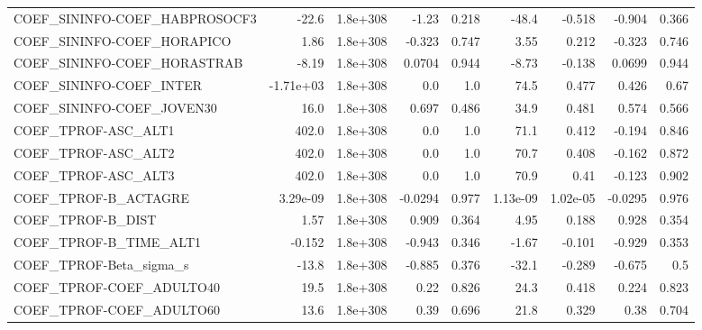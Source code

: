 \begin{tabular}{lrrrrrrrr}
COEF\_SININFO-COEF\_HABPROSOCF3     &       -22.6 &     1.8e+308 &   -1.23 &    0.218 &      -48.4 &      -0.518 &       -0.904 &         0.366 \\
COEF\_SININFO-COEF\_HORAPICO        &        1.86 &     1.8e+308 &  -0.323 &    0.747 &       3.55 &       0.212 &       -0.323 &         0.746 \\
COEF\_SININFO-COEF\_HORASTRAB       &       -8.19 &     1.8e+308 &  0.0704 &    0.944 &      -8.73 &      -0.138 &       0.0699 &         0.944 \\
COEF\_SININFO-COEF\_INTER           &   -1.71e+03 &     1.8e+308 &     0.0 &      1.0 &       74.5 &       0.477 &        0.426 &          0.67 \\
COEF\_SININFO-COEF\_JOVEN30         &        16.0 &     1.8e+308 &   0.697 &    0.486 &       34.9 &       0.481 &        0.574 &         0.566 \\
COEF\_TPROF-ASC\_ALT1               &       402.0 &     1.8e+308 &     0.0 &      1.0 &       71.1 &       0.412 &       -0.194 &         0.846 \\
COEF\_TPROF-ASC\_ALT2               &       402.0 &     1.8e+308 &     0.0 &      1.0 &       70.7 &       0.408 &       -0.162 &         0.872 \\
COEF\_TPROF-ASC\_ALT3               &       402.0 &     1.8e+308 &     0.0 &      1.0 &       70.9 &        0.41 &       -0.123 &         0.902 \\
COEF\_TPROF-B\_ACTAGRE              &    3.29e-09 &     1.8e+308 & -0.0294 &    0.977 &   1.13e-09 &    1.02e-05 &      -0.0295 &         0.976 \\
COEF\_TPROF-B\_DIST                 &        1.57 &     1.8e+308 &   0.909 &    0.364 &       4.95 &       0.188 &        0.928 &         0.354 \\
COEF\_TPROF-B\_TIME\_ALT1            &      -0.152 &     1.8e+308 &  -0.943 &    0.346 &      -1.67 &      -0.101 &       -0.929 &         0.353 \\
COEF\_TPROF-Beta\_sigma\_s           &       -13.8 &     1.8e+308 &  -0.885 &    0.376 &      -32.1 &      -0.289 &       -0.675 &           0.5 \\
COEF\_TPROF-COEF\_ADULTO40          &        19.5 &     1.8e+308 &    0.22 &    0.826 &       24.3 &       0.418 &        0.224 &         0.823 \\
COEF\_TPROF-COEF\_ADULTO60          &        13.6 &     1.8e+308 &    0.39 &    0.696 &       21.8 &       0.329 &         0.38 &         0.704 \\

\end{tabular}
